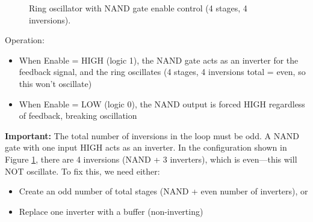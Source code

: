 \documentclass[10pt]{article}
\begin{document}
\begin{figure}[h]
\centering
{}
\caption{Ring oscillator with NAND gate enable control (4 stages, 4 inversions).}
\label{fig:ring_nand}
\end{figure}

Operation: 
\begin{itemize}
    \item When Enable = HIGH (logic 1), the NAND gate acts as an inverter for the feedback signal, and the ring oscillates (4 stages, 4 inversions total = even, so this won't oscillate)
    \item When Enable = LOW (logic 0), the NAND output is forced HIGH regardless of feedback, breaking oscillation
\end{itemize}

\textbf{Important: } The total number of inversions in the loop must be odd.  A NAND gate with one input HIGH acts as an inverter.  In the configuration shown in Figure \ref{fig:ring_nand}, there are 4 inversions (NAND + 3 inverters), which is even—this will NOT oscillate.  To fix this, we need either:
\begin{itemize}
    \item Create an odd number of total stages (NAND + even number of inverters), or
    \item Replace one inverter with a buffer (non-inverting)
\end{itemize}
\end{document}
